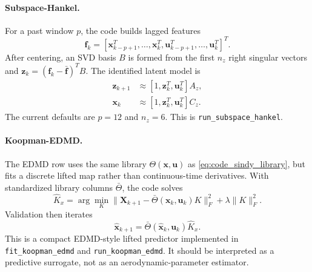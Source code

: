 \documentclass[11pt]{article}
\begin{document}
\paragraph{Subspace-Hankel.}
For a past window $p$, the code builds lagged features
\[
    \mathbf{f}_k =
    [\mathbf{x}_{k-p+1}^T,\ldots,\mathbf{x}_k^T,
     \mathbf{u}_{k-p+1}^T,\ldots,\mathbf{u}_k^T]^T.
\]
After centering, an SVD basis $B$ is formed from the first $n_z$ right singular
vectors and $\mathbf{z}_k=(\mathbf{f}_k-\bar{\mathbf{f}})^TB$. The identified
latent model is
\begin{align}
    \mathbf{z}_{k+1} &\approx [1,\mathbf{z}_k^T,\mathbf{u}_k^T]A_z,\\
    \mathbf{x}_{k} &\approx [1,\mathbf{z}_k^T,\mathbf{u}_k^T]C_z.
    \label{eq:code_subspace}
\end{align}
The current defaults are $p=12$ and $n_z=6$. This is
\texttt{run\_subspace\_hankel}.

\paragraph{Koopman-EDMD.}
The EDMD row uses the same library $\Theta(\mathbf{x},\mathbf{u})$ as
\eqref{eq:code_sindy_library}, but fits a discrete lifted map rather than
continuous-time derivatives. With standardized library columns
$\bar{\Theta}$, the code solves
\begin{equation}
    \widehat{K}_x
    =
    \arg\min_K
    \|\mathbf{X}_{k+1}-\bar{\Theta}(\mathbf{x}_k,\mathbf{u}_k)K\|_F^2
    +\lambda\|K\|_F^2.
    \label{eq:code_koopman_edmd}
\end{equation}
Validation then iterates
\[
    \hat{\mathbf{x}}_{k+1}
    =
    \bar{\Theta}(\hat{\mathbf{x}}_k,\mathbf{u}_k)\widehat{K}_x.
\]
This is a compact EDMD-style lifted predictor implemented in
\texttt{fit\_koopman\_edmd} and \texttt{run\_koopman\_edmd}. It should be
interpreted as a predictive surrogate, not as an aerodynamic-parameter
estimator.
\end{document}
